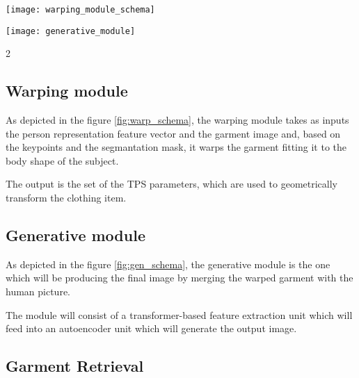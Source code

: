 \begin{figure*}[h]
\centering
\texttt{[image: warping\_module\_schema]}
\caption{Warping module schema}
\label{fig:warp_schema}
\end{figure*}

\begin{figure*}[h]
\centering
\texttt{[image: generative\_module]}
\caption{Generative module schema}
\label{fig:gen_schema}
\end{figure*}

\begin{multicols}{2}

\subsection{Warping module}
As depicted in the figure \ref{fig:warp_schema}, the warping module takes as inputs the person representation feature vector and the garment image and, based on the keypoints and the segmantation mask, it warps the garment fitting it to the body shape of the subject.

The output is the set of the TPS parameters, which are used to geometrically transform the clothing item.



\subsection{Generative module}
As depicted in the figure \ref{fig:gen_schema}, the generative module is the one which will be producing the final image by merging the warped garment with the human picture.

The module will consist of a transformer-based feature extraction unit which will feed into an autoencoder unit which will generate the output image.




\subsection{Garment Retrieval}


\end{multicols}